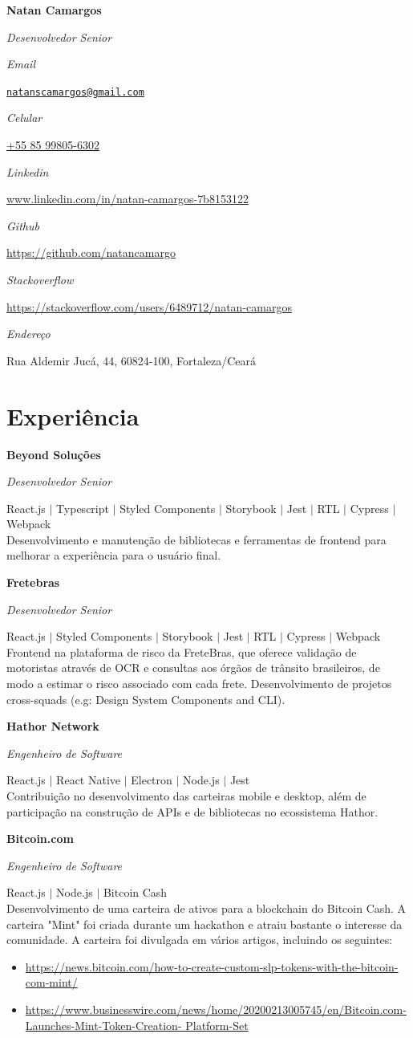 \documentclass[12pt]{article}
\newcommand{\sepspace}{\vspace*{1em}}
\newcommand{\name}[1]{
  \Huge
  \fontfamily{phv}\selectfont
  \begin{center} \textbf{#1} \end{center}\par
  \normalsize\normalfont}
\newcommand{\motto}[1]{
  \large
  \fontfamily{phv}\selectfont
  \begin{center} \textsl{#1}\end{center}\par
  \normalsize \normalfont}
\newcommand{\info}[2]{
  \noindent
  \parbox{6em}{\textsl{#1}} #2 \par}
\newcommand{\work}[4]{
  \noindent  \textbf{#1}
  \hfill 
  \framebox{
    \parbox{6em}{%
      \centering\textbf{#2}}} \par
  \noindent \textit{#3} \par
  \vspace*{0.5em}
  \noindent \small #4 
  \normalsize \par}
\begin{document}
\name{Natan Camargos}
\vspace*{-10pt}
\motto{Desenvolvedor Senior}
\sepspace
\info{Email}{\href{mailto:natanscamargos@gmail.com}{\texttt{natanscamargos@gmail.com}} }
\info{Celular}{\href{tel:+5585998056302}{+55 85 99805-6302}}
\info{Linkedin}{\href{www.linkedin.com/in/natan-camargos-7b8153122}{www.linkedin.com/in/natan-camargos-7b8153122}}
\info{Github}{\href{https://github.com/natancamargo}{https://github.com/natancamargo}}
\info{Stackoverflow}{\href{https://stackoverflow.com/users/6489712/natan-camargos}{https://stackoverflow.com/users/6489712/natan-camargos}}

\info{Endereço}{Rua Aldemir Jucá, 44, 60824-100, Fortaleza/Ceará}

\section*{Experiência}
\work
{Beyond Soluções}
{2022--2023}
{Desenvolvedor Senior}
{React.js $|$ Typescript $|$ Styled Components $|$ Storybook $|$ Jest $|$ RTL $|$ Cypress $|$
Webpack\\
Desenvolvimento e manutenção de bibliotecas e ferramentas de frontend para melhorar a experiência para o usuário final.
}
\sepspace
\work
{Fretebras}
{2020--2021}
{Desenvolvedor Senior}
{React.js $|$ Styled Components $|$ Storybook $|$ Jest $|$ RTL $|$ Cypress $|$ Webpack\\
Frontend na plataforma de risco da FreteBras, que oferece validação de
motoristas através de OCR e consultas aos órgãos de trânsito brasileiros,
de modo a estimar o risco associado com cada frete. Desenvolvimento de
projetos cross-squads (e.g: Design System Components and CLI).
}
\sepspace
\work
{Hathor Network}
{2020--2021}
{Engenheiro de Software}
{React.js $|$ React Native $|$ Electron $|$ Node.js $|$ Jest\\
Contribuição no desenvolvimento das carteiras mobile e desktop, além de
participação na construção de APIs e de bibliotecas no ecossistema Hathor.
}
\sepspace
\work
{Bitcoin.com}
{2020--2021}
{Engenheiro de Software}
{React.js $|$ Node.js $|$ Bitcoin Cash\\
Desenvolvimento de uma carteira de ativos para a blockchain do Bitcoin
Cash. A carteira "Mint" foi criada durante um hackathon e atraiu bastante
o interesse da comunidade. A carteira foi divulgada em vários artigos,
incluindo os seguintes:
\begin{itemize}
  \item \href{https://news.bitcoin.com/how-to-create-custom-slp-tokens-with-the-bitcoin-com-mint/}
{https://news.bitcoin.com/how-to-create-custom-slp-tokens-with-the-bitcoin-com-mint/}
  \item \href{https://www.businesswire.com/news/home/20200213005745/en/Bitcoin.com-Launches-Mint-Token-Creation-
Platform-Set}{https://www.businesswire.com/news/home/20200213005745/en/Bitcoin.com-Launches-Mint-Token-Creation-
Platform-Set}
\end{itemize}
}
\end{document}
